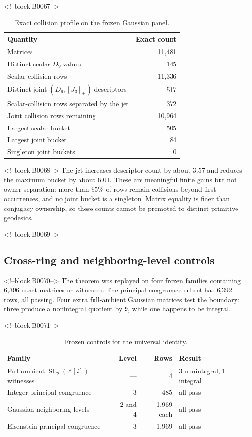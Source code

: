 \documentclass[11pt,a4paper]{article}
\theoremstyle{definition}
\theoremstyle{remark}
\newcommand{\SL}{\operatorname{SL}}
\newcommand{\Gauss}{\mathbb{Z}[i]}
\begin{document}
<!--block:B0067-->
\begin{table}[t]
\centering
\caption{Exact collision profile on the frozen Gaussian panel.}
\label{tab:collision}
\begin{tabular}{lr}
\toprule
Quantity & Exact count \\
\midrule
Matrices & 11,481 \\
Distinct scalar \(D_9\) values & 145 \\
Scalar collision rows & 11,336 \\
Distinct joint \((D_9,[J_3]_{\pm})\) descriptors & 517 \\
Scalar-collision rows separated by the jet & 372 \\
Joint collision rows remaining & 10,964 \\
Largest scalar bucket & 505 \\
Largest joint bucket & 84 \\
Singleton joint buckets & 0 \\
\bottomrule
\end{tabular}
\end{table}

<!--block:B0068-->
The jet increases descriptor count by about \(3.57\) and reduces the maximum bucket by about \(6.01\). These are meaningful finite gains but not owner separation: more than \(95\%\) of rows remain collisions beyond first occurrences, and no joint bucket is a singleton. Matrix equality is finer than conjugacy ownership, so these counts cannot be promoted to distinct primitive geodesics.

<!--block:B0069-->
\subsection{Cross-ring and neighboring-level controls}

<!--block:B0070-->
The theorem was replayed on four frozen families containing 6,396 exact matrices or witnesses. The principal-congruence subset has 6,392 rows, all passing. Four extra full-ambient Gaussian matrices test the boundary: three produce a nonintegral quotient by \(9\), while one happens to be integral.

<!--block:B0071-->
\begin{table}[t]
\centering
\caption{Frozen controls for the universal identity.}
\label{tab:controls}
\begin{tabular}{lrrl}
\toprule
Family & Level & Rows & Result \\
\midrule
Full ambient \(\SL_2(\Gauss)\) witnesses & --- & 4 & 3 nonintegral, 1 integral \\
Integer principal congruence & 3 & 485 & all pass \\
Gaussian neighboring levels & 2 and 4 & 1,969 each & all pass \\
Eisenstein principal congruence & 3 & 1,969 & all pass \\
\bottomrule
\end{tabular}
\end{table}
\end{document}
